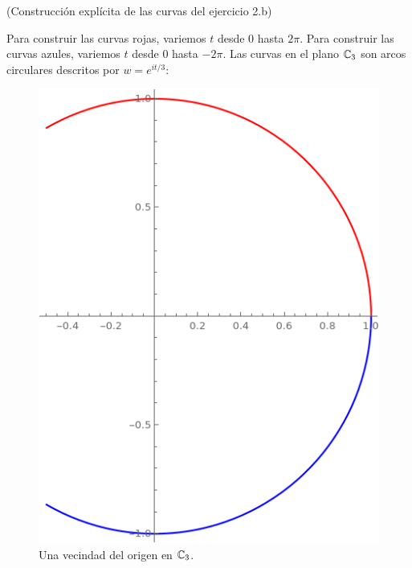 \begin{addendum}
(Construcción explícita de las curvas del ejercicio 2.b)
\end{addendum}

\begin{solution}
Para construir las curvas rojas, variemos $t$ desde $0$ hasta $2\pi$. Para construir las curvas azules, variemos $t$ desde $0$ hasta $-2\pi$. Las curvas en el plano $\mathbb C_3$ son arcos circulares descritos por $w = e^{it/3}$:
\begin{figure}[h]
    \centering
    \includegraphics[scale=0.4]{c3.png}
    \caption{Una vecindad del origen en $\mathbb C_3$.}
\end{figure}

\newpage


\end{solution}
